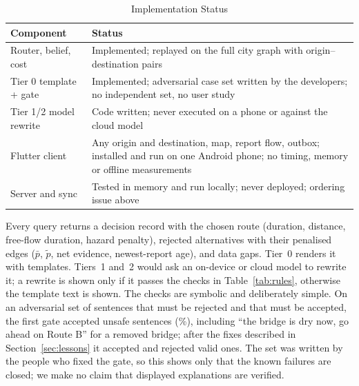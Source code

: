 \documentclass[conference]{IEEEtran}
\begin{document}
\begin{table}[t]
\centering
\caption{Implementation Status}
\label{tab:status}
\footnotesize
\begin{tabular}{>{\raggedright\arraybackslash}p{2.6cm}>{\raggedright\arraybackslash}p{5.2cm}}
\toprule
Component & Status\\
\midrule
Router, belief, cost & Implemented; replayed on the full city graph with \NOD{} origin--destination pairs\\
Tier 0 template + gate & Implemented; adversarial case set written by the developers; no independent set, no user study\\
Tier 1/2 model rewrite & Code written; never executed on a phone or against the cloud model\\
Flutter client & Any origin and destination, map, report flow, outbox; installed and run on one Android phone; no timing, memory or offline measurements\\
Server and sync & Tested in memory and run locally; never deployed; ordering issue above\\
\bottomrule
\end{tabular}
\end{table}

Every query returns a decision record with the chosen route (duration, distance, free-flow duration, hazard penalty), rejected alternatives with their penalised edges ($\bar p$, $\tilde p$, net evidence, newest-report age), and data gaps. Tier~0 renders it with templates. Tiers~1 and~2 would ask an on-device or cloud model to rewrite it; a rewrite is shown only if it passes the checks in Table~\ref{tab:rules}, otherwise the template text is shown. The checks are symbolic and deliberately simple. On an adversarial set of \VfReject{} sentences that must be rejected and \VfAccept{} that must be accepted, the first gate accepted \VbFalseAcc{} unsafe sentences (\VbFalseAccPct\%), including ``the bridge is dry now, go ahead on Route B'' for a removed bridge; after the fixes described in Section~\ref{sec:lessons} it accepted \VfFalseAcc{} and rejected \VfFalseRej{} valid ones. The set was written by the people who fixed the gate, so this shows only that the known failures are closed; we make no claim that displayed explanations are verified.
\end{document}
